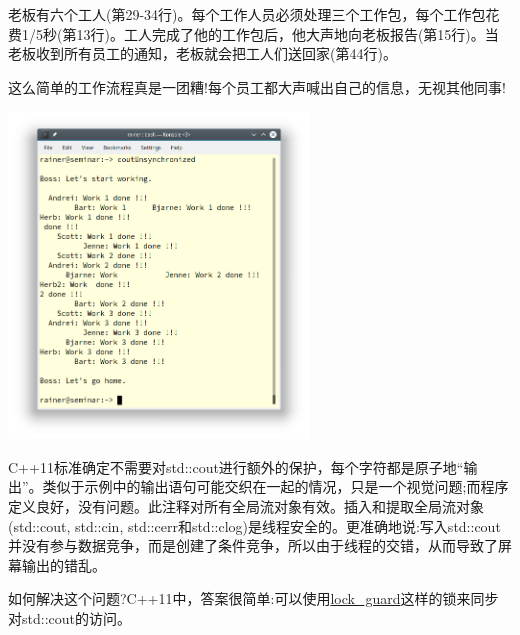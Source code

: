 老板有六个工人(第29-34行)。每个工作人员必须处理三个工作包，每个工作包花费1/5秒(第13行)。工人完成了他的工作包后，他大声地向老板报告(第15行)。当老板收到所有员工的通知，老板就会把工人们送回家(第44行)。

这么简单的工作流程真是一团糟!每个员工都大声喊出自己的信息，无视其他同事!

\begin{center}
\includegraphics[width=0.6\textwidth]{content/3/chapter6/images/29.png}\\
\end{center}

\begin{tcolorbox}[breakable,enhanced jigsaw,colback=blue!5!white,colframe=blue!75!black,title={std::cout是线程安全的}]
	
C++11标准确定不需要对std::cout进行额外的保护，每个字符都是原子地“输出”。类似于示例中的输出语句可能交织在一起的情况，只是一个视觉问题;而程序定义良好，没有问题。此注释对所有全局流对象有效。插入和提取全局流对象(std::cout, std::cin, std::cerr和std::clog)是线程安全的。更准确地说:写入std::cout并没有参与数据竞争，而是创建了条件竞争，所以由于线程的交错，从而导致了屏幕输出的错乱。
	
\end{tcolorbox}

如何解决这个问题?C++11中，答案很简单:可以使用\href{https://en.cppreference.com/w/cpp/thread/lock_guard}{lock\_guard}这样的锁来同步对std::cout的访问。

